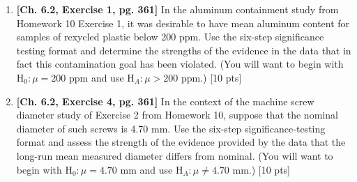 \documentclass[11pt]{article}\usepackage[]{graphicx}\usepackage[]{color}
\begin{document}
{\begin{enumerate}
\begin{Schunk}
\begin{Soutput}
| Diameter| Frequency|
|--------:|---------:|
|     4.52|         1|
|     4.66|         4|
|     4.67|         7|
|     4.68|         7|
|     4.69|        14|
|     4.70|         9|
|     4.71|         4|
|     4.72|         4|
\end{Soutput}
\end{Schunk}
  
      \begin{enumerate}
          \item Compute the sample mean and standard deviation for these data. [5 pts]
          \item Use your sample values from a) and make a 98\% two-sided confidence interval for the mean diameter of such screws as measured by this students with these calipers. [ 5 pts]
          \item Repeat part b) using 99\% confidence. How does this interval compare with the one from b)? [5 pts]
          \item Use your values from a) and find a 98\% lower confidence bound for the mean diameter. (Find a # such that $(\#, \infty)$ is a 98\% confidence interval.) How does this value compare to the lower endpoint of your interval from b)? [5 pts]
          \item Repeat part d) using 99\% confidence. How does the value computed here compare with your answer for d)? [5 pts]
          \item Interpret your interval from b) for someone with little statistical background.[ 5 pts]
    \end{enumerate}
    
\item\textbf {[Ch. 6.2, Exercise 1, pg. 361]} In the aluminum containment study from Homework 10 Exercise 1, it was desirable to have mean aluminum content for samples of rexycled plastic below 200 ppm. Use the six-step significance testing format and determine the strengths of the evidence in the data that in fact this contamination goal has been violated. (You will want to begin with $\text{H}_0: \mu = 200$ ppm and use $\text{H}_A: \mu > 200$ ppm.) [10 pts]

\item\textbf {[Ch. 6.2, Exercise 4, pg. 361]} In the context of the machine screw diameter study of Exercise 2 from Homework 10, suppose that the nominal diameter of such screws is 4.70 mm. Use the six-step significance-testing format and assess the strength of the evidence provided by the data that the long-run mean measured diameter differs from nominal. (You will want to begin with $\text{H}_0: \mu = 4.70$ mm and use $\text{H}_A: \mu \not= 4.70$ mm.) [10 pts]
  

\end{enumerate}}
\end{document}
